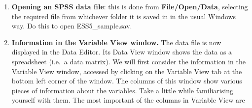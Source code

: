 \documentclass[11pt,a4paper,openany]{book}
\begin{document}
\begin{enumerate}
\def\labelenumi{\arabic{enumi}.}
\item
  \textbf{Opening an SPSS data file}: this is done from
  \textbf{File/Open/Data}, selecting the required file from whichever
  folder it is saved in in the usual Windows way. Do this to open
  ESS5\_sample.sav.
\item
  \textbf{Information in the Variable View window.} The data file is now
  displayed in the Data Editor. Its Data View window shows the data as a
  spreadsheet (i.e.~a data matrix). We will first consider the
  information in the Variable View window, accessed by clicking on the
  Variable View tab at the bottom left corner of the window. The columns
  of this window show various pieces of information about the variables.
  Take a little while familiarising yourself with them. The most
  important of the columns in Variable View are


\end{enumerate}
\end{document}
